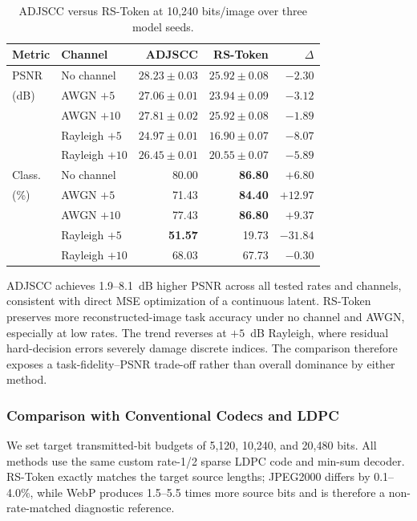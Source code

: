 \documentclass[letterpaper,journal]{IEEEtran}
\begin{document}
\begin{table}[!t]
\centering
\caption{ADJSCC versus RS-Token at 10,240 bits/image over three model seeds.}
\label{tab:adjscc}
\scriptsize
\setlength{\tabcolsep}{3pt}
\begin{tabular}{@{}llrrr@{}}
\toprule
Metric & Channel & ADJSCC & RS-Token & $\Delta$ \\ \midrule
PSNR & No channel & $28.23\pm0.03$ & $25.92\pm0.08$ & $-2.30$ \\
(dB) & AWGN $+5$ & $27.06\pm0.01$ & $23.94\pm0.09$ & $-3.12$ \\
& AWGN $+10$ & $27.81\pm0.02$ & $25.92\pm0.08$ & $-1.89$ \\
& Rayleigh $+5$ & $24.97\pm0.01$ & $16.90\pm0.07$ & $-8.07$ \\
& Rayleigh $+10$ & $26.45\pm0.01$ & $20.55\pm0.07$ & $-5.89$ \\ \midrule
Class. & No channel & 80.00 & \textbf{86.80} & $+6.80$ \\
(\%) & AWGN $+5$ & 71.43 & \textbf{84.40} & $+12.97$ \\
& AWGN $+10$ & 77.43 & \textbf{86.80} & $+9.37$ \\
& Rayleigh $+5$ & \textbf{51.57} & 19.73 & $-31.84$ \\
& Rayleigh $+10$ & 68.03 & 67.73 & $-0.30$ \\ \bottomrule
\end{tabular}
\end{table}

ADJSCC achieves 1.9--8.1~dB higher PSNR across all tested rates and channels, consistent with direct MSE optimization of a continuous latent. RS-Token preserves more reconstructed-image task accuracy under no channel and AWGN, especially at low rates. The trend reverses at $+5$~dB Rayleigh, where residual hard-decision errors severely damage discrete indices. The comparison therefore exposes a task-fidelity--PSNR trade-off rather than overall dominance by either method.

\subsubsection{Comparison with Conventional Codecs and LDPC}
\label{sec:ldpc}
We set target transmitted-bit budgets of 5,120, 10,240, and 20,480 bits. All methods use the same custom rate-1/2 sparse LDPC code and min-sum decoder. RS-Token exactly matches the target source lengths; JPEG2000 differs by 0.1--4.0\%, while WebP produces 1.5--5.5 times more source bits and is therefore a non-rate-matched diagnostic reference.
\end{document}
